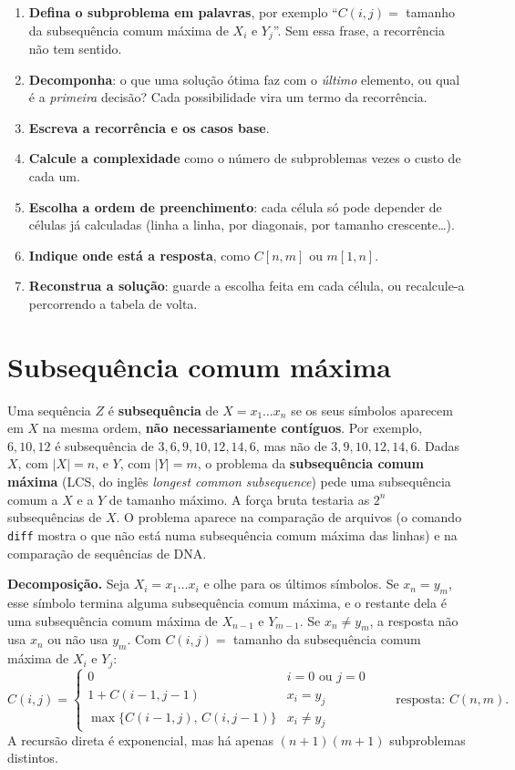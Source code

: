 \begin{roteiro}
\begin{enumerate}
  \item \textbf{Defina o subproblema em palavras}, por exemplo ``$C(i,j)=$ tamanho da subsequência comum máxima de $X_i$ e $Y_j$''. Sem essa frase, a recorrência não tem sentido.
  \item \textbf{Decomponha}: o que uma solução ótima faz com o \emph{último} elemento, ou qual é a \emph{primeira} decisão? Cada possibilidade vira um termo da recorrência.
  \item \textbf{Escreva a recorrência e os casos base}.
  \item \textbf{Calcule a complexidade} como o número de subproblemas vezes o custo de cada um.
  \item \textbf{Escolha a ordem de preenchimento}: cada célula só pode depender de células já calculadas (linha a linha, por diagonais, por tamanho crescente\dots).
  \item \textbf{Indique onde está a resposta}, como $C[n,m]$ ou $m[1,n]$.
  \item \textbf{Reconstrua a solução}: guarde a escolha feita em cada célula, ou recalcule-a percorrendo a tabela de volta.
\end{enumerate}
\end{roteiro}

\section{Subsequência comum máxima}\label{sec:lcs}
Uma sequência $Z$ é \textbf{subsequência} de $X=x_1\dots x_n$ se os seus símbolos aparecem em $X$ na mesma ordem, \textbf{não necessariamente contíguos}. Por exemplo, $6,10,12$ é subsequência de $3,6,9,10,12,14,6$, mas não de $3,9,10,12,14,6$. Dadas $X$, com $|X|=n$, e $Y$, com $|Y|=m$, o problema da \textbf{subsequência comum máxima} (LCS, do inglês \emph{longest common subsequence}) pede uma subsequência comum a $X$ e a $Y$ de tamanho máximo. A força bruta testaria as $2^n$ subsequências de $X$. O problema aparece na comparação de arquivos (o comando \texttt{diff} mostra o que não está numa subsequência comum máxima das linhas) e na comparação de sequências de DNA.

\textbf{Decomposição.} Seja $X_i=x_1\dots x_i$ e olhe para os últimos símbolos. Se $x_n=y_m$, esse símbolo termina alguma subsequência comum máxima, e o restante dela é uma subsequência comum máxima de $X_{n-1}$ e $Y_{m-1}$. Se $x_n\ne y_m$, a resposta não usa $x_n$ ou não usa $y_m$. Com $C(i,j)=$ tamanho da subsequência comum máxima de $X_i$ e $Y_j$:
\[
C(i,j)=\begin{cases}0 & i=0\text{ ou }j=0\\ 1+C(i-1,j-1) & x_i=y_j\\ \max\{C(i-1,j),\,C(i,j-1)\} & x_i\ne y_j\end{cases}\qquad\text{resposta: }C(n,m).
\]
A recursão direta é exponencial, mas há apenas $(n+1)(m+1)$ subproblemas distintos.

